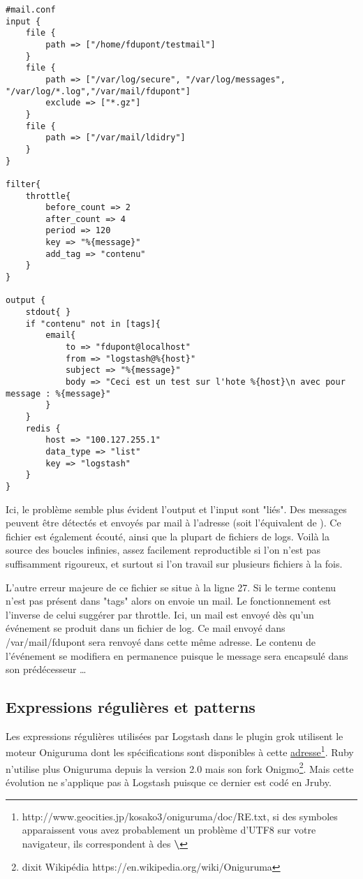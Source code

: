 \begin{lstlisting}[style=logstash,label={lst:conflogstashiniteloop2},caption={Infinite loop concaténé}]
#mail.conf
input {
    file {
        path => ["/home/fdupont/testmail"]
    }
    file {
        path => ["/var/log/secure", "/var/log/messages", "/var/log/*.log","/var/mail/fdupont"]
        exclude => ["*.gz"]
    }
    file {
        path => ["/var/mail/ldidry"]
    }
}

filter{
    throttle{
        before_count => 2
        after_count => 4
        period => 120
        key => "%{message}"
        add_tag => "contenu"
    }
}

output {
    stdout{ }
    if "contenu" not in [tags]{
        email{
            to => "fdupont@localhost"
            from => "logstash@%{host}"
            subject => "%{message}"
            body => "Ceci est un test sur l'hote %{host}\n avec pour message : %{message}"
        }
    }
    redis {
        host => "100.127.255.1"
        data_type => "list"
        key => "logstash"
    }
}
\end{lstlisting}

Ici, le problème semble plus évident l'output et l'input sont "liés". Des messages
peuvent être détectés et envoyés par mail à l'adresse  (soit
l'équivalent de ). Ce fichier est également écouté, ainsi que la 
plupart de fichiers de logs. Voilà la source des boucles infinies, assez facilement
reproductible si l'on n'est pas suffisamment rigoureux, et surtout si l'on travail 
sur plusieurs fichiers à la fois.

L'autre erreur majeure de ce fichier se situe à la ligne 27. Si le terme contenu 
n'est pas présent dans "tags" alors on envoie un mail. Le fonctionnement est l'inverse 
de celui suggérer par throttle. Ici, un mail est envoyé dès qu'un événement se produit
dans un fichier de log. Ce mail envoyé dans /var/mail/fdupont sera renvoyé dans cette
même adresse. Le contenu de l'événement se modifiera en permanence puisque le message
sera encapsulé dans son prédécesseur \ldots

\subsection{Expressions régulières et patterns}
Les expressions régulières utilisées par Logstash dans le plugin grok utilisent le 
moteur Oniguruma dont les spécifications sont disponibles à cette 
\href{http://www.geocities.jp/kosako3/oniguruma/doc/RE.txt}{adresse}\footnote{http://www.geocities.jp/kosako3/oniguruma/doc/RE.txt, 
si des symboles \textbf{ \textyen} apparaissent vous avez probablement un problème d'UTF8 sur 
votre navigateur, ils correspondent à des \textbf{ \textbackslash}}.
Ruby n'utilise plus Oniguruma depuis la version 2.0 mais son fork Onigmo\footnote{
dixit Wikipédia https://en.wikipedia.org/wiki/Oniguruma}. Mais cette évolution ne
s'applique pas à Logstash puisque ce dernier est codé en Jruby.

